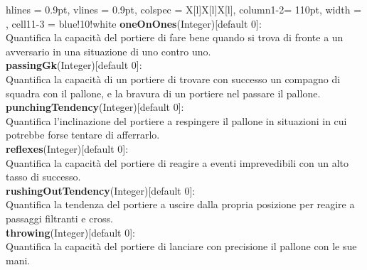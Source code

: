 \begin{tblr}{
    hlines = {0.9pt}, vlines = {0.9pt}, colspec = {X[l]X[l]X[l]}, column{1-2}= {110pt},
    width = \textwidth, cell{1}{1-3} = {blue!10!white}
}
{		\medskip\textbf{oneOnOnes}(Integer)[default 0]:\\
			Quantifica la capacità del portiere
			di fare bene quando si trova
			di fronte a un avversario in una situazione
			di uno contro uno.\\
		\medskip\textbf{passingGk}(Integer)[default 0]:\\
			Quantifica la capacità di un portiere di trovare
			con successo un compagno di squadra con il pallone,
			e la bravura di un portiere nel passare il pallone.\\
		\medskip\textbf{punchingTendency}(Integer)[default 0]:\\
			Quantifica l'inclinazione del portiere
			a respingere il pallone in situazioni
			in cui potrebbe forse tentare di afferrarlo.\\
		\medskip\textbf{reflexes}(Integer)[default 0]:\\
			Quantifica la capacità del portiere
			di reagire a eventi imprevedibili con
			un alto tasso di successo.\\
		\medskip\textbf{rushingOutTendency}(Integer)[default 0]:\\
			Quantifica la tendenza del portiere a uscire
			dalla propria posizione per reagire
			a passaggi filtranti e cross.\\
		\medskip\textbf{throwing}(Integer)[default 0]:\\
			Quantifica la capacità del portiere di lanciare
			con precisione il pallone con le sue mani.
	}
	\\
\end{tblr}

\newpage



